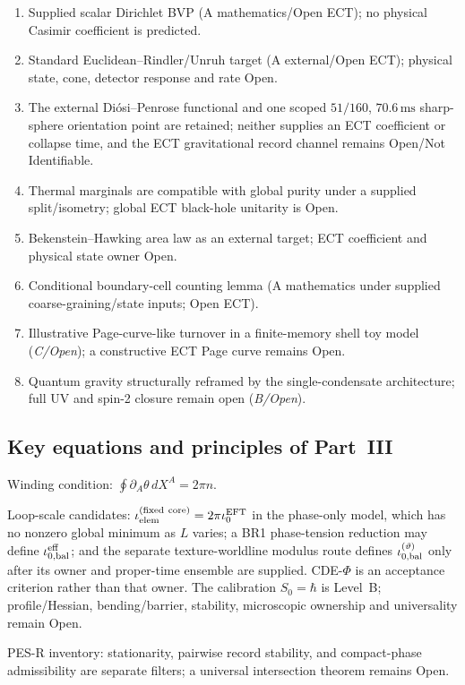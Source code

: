 \documentclass[11pt,a4paper]{article}
\begin{document}
\begin{enumerate}
\item Supplied scalar Dirichlet BVP (A mathematics/Open ECT); no physical Casimir coefficient is predicted.
\item Standard Euclidean--Rindler/Unruh target (A external/Open ECT); physical state, cone, detector response and rate Open.
\item The external Di\'osi--Penrose functional and one scoped $51/160$, $70.6\,\mathrm{ms}$ sharp-sphere orientation point are retained; neither supplies an ECT coefficient or collapse time, and the ECT gravitational record channel remains Open/Not Identifiable.
\item Thermal marginals are compatible with global purity under a supplied split/isometry; global ECT black-hole unitarity is Open.
\item Bekenstein--Hawking area law as an external target; ECT coefficient and physical state owner Open.
\item Conditional boundary-cell counting lemma (A mathematics under supplied coarse-graining/state inputs; Open ECT).
\item Illustrative Page-curve-like turnover in a finite-memory shell toy model (\emph{C/Open}); a constructive ECT Page curve remains Open.
\item Quantum gravity structurally reframed by the single-condensate architecture; full UV and spin-2 closure remain open (\emph{B/Open}).
\end{enumerate}

\subsection{Key equations and principles of Part~III}

Winding condition: $\oint \partial_A\theta\,dX^A = 2\pi n$.

Loop-scale candidates: $\iota_{\rm elem}^{\rm(fixed\ core)}=2\pi \iota_0^{\rm EFT}$ in the phase-only model, which has no nonzero global minimum as $L$ varies; a BR1 phase-tension reduction may define $\iota_{0,\rm bal}^{\rm eff}$; and the separate texture-worldline modulus route defines $\iota_{0,\rm bal}^{(\vartheta)}$ only after its owner and proper-time ensemble are supplied.  CDE-$\Phi$ is an acceptance criterion rather than that owner.  The calibration $S_0=\hbar$ is Level~B; profile/Hessian, bending/barrier, stability, microscopic ownership and universality remain Open.

PES-R inventory: stationarity, pairwise record stability, and compact-phase admissibility are separate filters; a universal intersection theorem remains Open.
\end{document}
